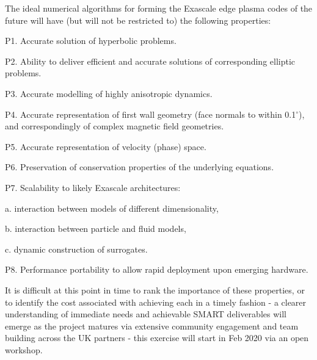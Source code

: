 \documentclass{article}
\begin{document}
\vspace{24pt}
The ideal numerical algorithms for forming the Exascale edge plasma codes of the 
future will have (but will not be restricted to) the following properties:

\vspace{24pt}
\leftskip=0pt
P1. Accurate solution of hyperbolic problems.

\vspace{12pt}
P2. Ability to deliver efficient and accurate solutions of corresponding elliptic 
problems.

\vspace{12pt}
P3. Accurate modelling of highly anisotropic dynamics. 

\vspace{12pt}
P4. Accurate representation of first wall geometry (face normals to within 0.1$^\circ$), 
and correspondingly of complex magnetic field geometries.

\vspace{12pt}
P5. Accurate representation of velocity (phase) space.

\vspace{12pt}
P6. Preservation of conservation properties of the underlying equations.

\vspace{12pt}
P7. Scalability to likely Exascale architectures:

\vspace{12pt}
a. interaction between models of different dimensionality,

\vspace{12pt}
b. interaction between particle and fluid models,

\vspace{12pt}
c. dynamic construction of surrogates.

\vspace{12pt}
P8. Performance portability to allow rapid deployment upon emerging hardware.

\vspace{24pt}
\leftskip=-14pt
It is difficult at this point in time to rank the importance of these properties, 
or to identify the cost associated with achieving each in a timely fashion - a 
clearer understanding of immediate needs and achievable SMART deliverables will 
emerge as the project matures via extensive community engagement and team building 
across the UK partners - this exercise will start in Feb 2020 via an open workshop. 
\end{document}
